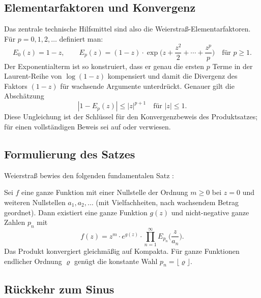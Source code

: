 \subsection{Elementarfaktoren und Konvergenz}

Das zentrale technische Hilfsmittel sind also die Weierstraß-Elementarfaktoren.
Für $p = 0, 1, 2, \ldots$ definiert man:
\begin{equation}
E_0(z) = 1 - z,
\qquad
E_p(z)
=
(1-z) \cdot \exp\!\biggl(z + \frac{z^2}{2} + \cdots + \frac{z^p}{p}\biggr)
\quad \text{für } p \ge 1.
\end{equation}
Der Exponentialterm ist so konstruiert, dass er genau die ersten $p$ Terme
in der Laurent-Reihe von $\log(1-z)$ kompensiert und damit die Divergenz
%
des Faktors $(1-z)$ für wachsende Argumente unterdrückt.
Genauer gilt die Abschätzung
\begin{equation}
|1 - E_p(z)| \le |z|^{p+1}
\quad \text{für } |z| \le 1.
\end{equation}
Diese Ungleichung ist der Schlüssel für den Konvergenzbeweis des Produktsatzes;
für einen vollständigen Beweis sei auf \cite{produkt:conway}
oder \cite{produkt:steinShakarchi} verwiesen.

\subsection{Formulierung des Satzes}

Weierstraß bewies den folgenden fundamentalen Satz \cite{produkt:steinShakarchi}:

\begin{satz}[Weierstraß, 1876]
%
Sei $f$ eine ganze Funktion mit einer Nullstelle der Ordnung $m \ge 0$ bei $z = 0$
und weiteren Nullstellen $a_1, a_2, \ldots$ (mit Vielfachheiten,
nach wachsendem Betrag geordnet).
Dann existiert eine ganze Funktion $g(z)$ und nicht-negative ganze Zahlen $p_n$ mit
\begin{equation}
f(z)
=
z^m \cdot e^{g(z)} \cdot
\prod_{n=1}^{\infty} E_{p_n}\!\biggl(\frac{z}{a_n}\biggr).
\end{equation}
Das Produkt konvergiert gleichmäßig auf Kompakta.
Für ganze Funktionen endlicher Ordnung $\varrho$ genügt die konstante Wahl
$p_n = \lfloor \varrho \rfloor$.
\end{satz}

\subsection{Rückkehr zum Sinus}

